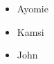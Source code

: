 \documentclass{article}
\begin{document}
	
	\begin{itemize}
	   \item Ayomie
	   \item Kamsi
	   \item John
	   \end{itemize}
\end{document}
